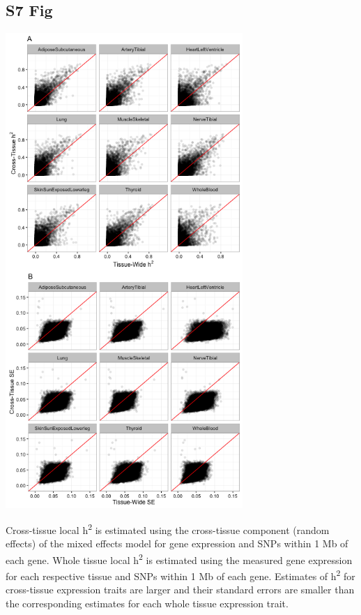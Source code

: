\documentclass[10pt,letterpaper]{article}
\begin{document}
\begin{singlespace}
\subsection*{S7 Fig}
\includegraphics[width=9cm]{Figures/GenArch_Supp/S3Fig.png}
\label{S7_Fig}

 Cross-tissue local h\textsuperscript{2} is estimated using the cross-tissue component (random effects) of the mixed effects model for gene expression and SNPs within 1 Mb of each gene. Whole tissue local h\textsuperscript{2} is estimated using the measured gene expression for each respective tissue and SNPs within 1 Mb of each gene. Estimates of h\textsuperscript{2} for cross-tissue expression traits are larger and their standard errors are smaller than the corresponding estimates for each whole tissue expression trait.


\end{singlespace}
\end{document}

